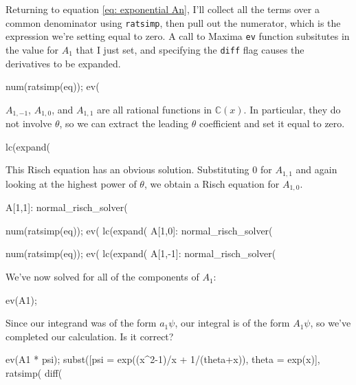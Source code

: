 
Returning to equation \eqref{eq: exponential An}, I'll collect all the
terms over a common denominator using {\tt ratsimp}, then pull out the
numerator, which is the expression we're setting equal to zero.
A call to Maxima {\tt ev} function subsitutes in the value for
$A_1$ that I just set, and specifying the {\tt diff} flag causes
the derivatives to be expanded.

\begin{maximablock}
num(ratsimp(eq));
ev(%
\end{maximablock}

$A_{1,-1}$, $A_{1,0}$, and $A_{1,1}$ are all rational functions in
${\mathbb C}(x)$.  In particular, they do not involve $\theta$, so we
can extract the leading $\theta$ coefficient and set it equal to zero.

\begin{maximablock}
lc(expand(%
\end{maximablock}

This Risch equation has an obvious solution.  Substituting $0$
for $A_{1,1}$ and again looking at the highest power
of $\theta$, we obtain a Risch equation for $A_{1,0}$.

\begin{maximablock}
A[1,1]: normal_risch_solver(%

num(ratsimp(eq));
ev(%
lc(expand(%
A[1,0]: normal_risch_solver(%

num(ratsimp(eq));
ev(%
lc(expand(%
A[1,-1]: normal_risch_solver(%
\end{maximablock}

We've now solved for all of the components of $A_1$:

\begin{maximablock}
ev(A1);
\end{maximablock}

Since our integrand was of the form $a_1 \psi$, our integral is of the
form $A_1 \psi$, so we've completed our calculation.  Is it correct?

\begin{maximablock}
ev(A1 * psi);
subst([psi = exp((x^2-1)/x + 1/(theta+x)),
       theta = exp(x)],
ratsimp(%
diff(%
\end{maximablock}



